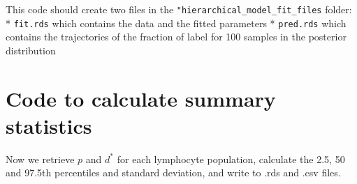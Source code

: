 \documentclass[
]{article}
\begin{document}
This code should create two files in the
\texttt{"hierarchical\_model\_fit\_files} folder: * \texttt{fit.rds}
which contains the data and the fitted parameters * \texttt{pred.rds}
which contains the trajectories of the fraction of label for 100 samples
in the posterior distribution

\hypertarget{code-to-calculate-summary-statistics}{%
\section{Code to calculate summary
statistics}\label{code-to-calculate-summary-statistics}}

Now we retrieve \(p\) and \(d^*\) for each lymphocyte population,
calculate the 2.5, 50 and 97.5th percentiles and standard deviation, and
write to .rds and .csv files.
\end{document}
